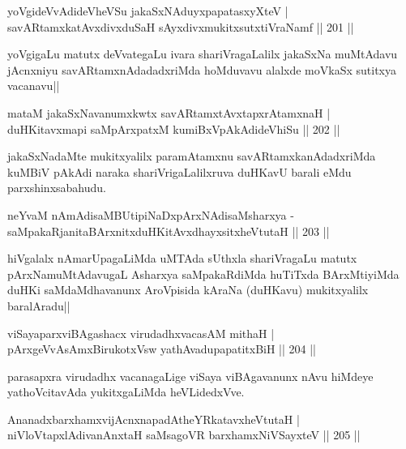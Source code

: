 \begin{shl}
yoVgideVvAdideVheVSu jakaSxNAduyxpapatasxyXteV |\\
savARtamxkatAvxdivxduSaH sAyxdivxmukitxsutxtiVraNamf \hfill || 201 ||
\end{shl}

\begin{artha}%
yoVgigaLu matutx deVvategaLu ivara shariVragaLalilx jakaSxNa muMtAdavu jAcnxniyu savARtamxnAdadadxriMda hoMduvavu alalxde moVkaSx sutitxya vacanavu||
\end{artha}

\begin{shl}
mataM jakaSxNavanumxkwtx savARtamxtAvxtapxrAtamxnaH |\\
duHKitavxmapi saMpArxpatxM kumiBxVpAkAdideVhiSu \hfill || 202 ||
\end{shl}

\begin{artha}
jakaSxNadaMte mukitxyalilx paramAtamxnu savARtamxkanAdadxriMda kuMBiV pAkAdi naraka shariVrigaLalilxruva duHKavU barali eMdu parxshinxsabahudu.
\end{artha}


\begin{shl}
neYvaM nAmAdisaMBUtipiNaDxpArxNAdisaMsharxya -\\
saMpakaRjanitaBArxnitxduHKitAvxdhayxsitxheVtutaH \hfill || 203 ||
\end{shl}

\begin{artha}
hiVgalalx nAmarUpagaLiMda uMTAda sUthxla shariVragaLu matutx pArxNamuMtAdavugaL Asharxya saMpakaRdiMda huTiTxda BArxMtiyiMda duHKi saMdaMdhavanunx AroVpisida kAraNa (duHKavu) mukitxyalilx baralAradu||
\end{artha}

\begin{shl}
viSayaparxviBAgashacx virudadhxvacasAM mithaH |\\
pArxgeVvAsAmxBirukotxV\s sw yathAvadupapatitxBiH \hfill || 204 ||
\end{shl}

\begin{artha}
parasapxra virudadhx vacanagaLige viSaya viBAgavanunx nAvu hiMdeye yathoVcitavAda yukitxgaLiMda heVLidedxVve.
\end{artha}

\begin{shl}
AnanadxbarxhamxvijAcnxnapadAtheYRkatavxheVtutaH |\\
niVloVtapxlAdivanAnxtaH saMsagoVR barxhamxNiVSayxteV \hfill || 205 ||
\end{shl}

